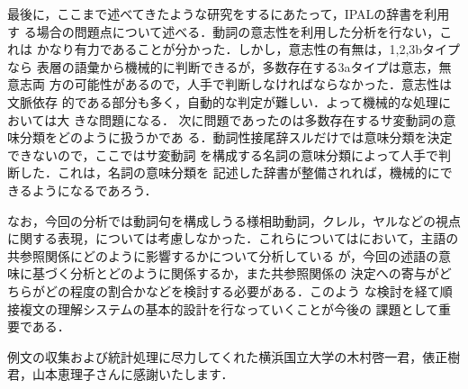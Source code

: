 最後に，ここまで述べてきたような研究をするにあたって，IPALの辞書を利用す
る場合の問題点について述べる．動詞の意志性を利用した分析を行ない，これは
かなり有力であることが分かった．しかし，意志性の有無は，1,2,3bタイプなら
表層の語彙から機械的に判断できるが，多数存在する3aタイプは意志，無意志両
方の可能性があるので，人手で判断しなければならなかった．意志性は文脈依存
的である部分も多く，自動的な判定が難しい．よって機械的な処理においては大
きな問題になる．
次に問題であったのは多数存在するサ変動詞の意味分類をどのように扱うかであ
る．動詞性接尾辞スルだけでは意味分類を決定できないので，ここではサ変動詞
を構成する名詞の意味分類によって人手で判断した．これは，名詞の意味分類を
記述した辞書が整備されれば，機械的にできるようになるであろう．

なお，今回の分析では動詞句を構成しうる様相助動詞，クレル，ヤルなどの視点
に関する表現，については考慮しなかった．これらについては\cite{中川動機
95}において，主語の共参照関係にどのように影響するかについて分析している
が，今回の述語の意味に基づく分析とどのように関係するか，また共参照関係の
決定への寄与がどちらがどの程度の割合かなどを検討する必要がある．このよう
な検討を経て順接複文の理解システムの基本的設計を行なっていくことが今後の
課題として重要である．



\vspace*{7mm}
\acknowledgment

例文の収集および統計処理に尽力してくれた横浜国立大学の木村啓一君，俵正樹君，山本恵理子さんに感謝いたします．






\begin{biography}


\end{biography}


